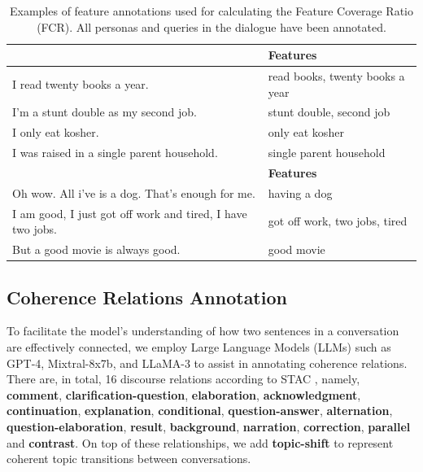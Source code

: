 \documentclass[letterpaper]{article} %
\begin{document}
\begin{table}[ht]
\centering
\def\arraystretch{1.2}%
\begin{tabular}{|p{4cm}|m{3.5cm}|}
\hline

\rowcolor[RGB]{204,217,245}
\multicolumn{1}{|c|}{\textbf{Persona description}} & \textbf{Features} \\
\hline

I read twenty books a year. & read books, twenty books a year   \\
\hline

I'm a stunt double as my second job. & stunt double, second job \\
\hline

I only eat kosher. & only eat kosher \\
\hline

I was raised in a single parent household. & single parent household \\
\hline

\rowcolor[RGB]{204,217,245}
\multicolumn{1}{|c|}{\textbf{Utterance}} & \textbf{Features} \\
\hline

Oh wow. All i've is a dog. That's enough for me. & having a dog  \\
\hline

I am good, I just got off work and tired, I have two jobs. & got off work, two jobs, tired \\
\hline

But a good movie is always good. & good movie \\
\hline

\end{tabular}
\caption{Examples of feature annotations used for calculating the Feature Coverage Ratio (FCR). All personas and queries in the dialogue have been annotated.}
\label{table:fcr-feature-annotated-example}
\end{table}


\subsection{Coherence Relations Annotation} \label{sec:coherence_reltaions_annotation}
To facilitate the model's understanding of how two sentences in a conversation are effectively connected, we employ Large Language Models (LLMs) such as GPT-4, Mixtral-8x7b, and LLaMA-3 to assist in annotating coherence relations. There are, in total, 16 discourse relations according to STAC \cite{asher-etal-2016-discourse}, namely, \textbf{comment}, \textbf{clarification-question}, \textbf{elaboration}, \textbf{acknowledgment}, \textbf{continuation}, \textbf{explanation}, \textbf{conditional}, \textbf{question-answer}, \textbf{alternation}, \textbf{question-elaboration}, \textbf{result}, \textbf{background}, \textbf{narration}, \textbf{correction}, \textbf{parallel} and \textbf{contrast}. On top of these relationships, we add \textbf{topic-shift} to represent coherent topic transitions between conversations. 
\end{document}
